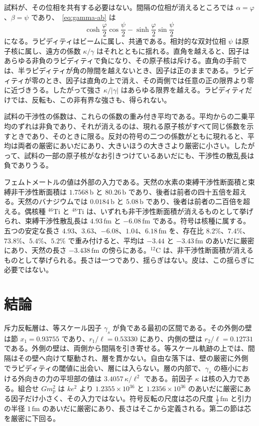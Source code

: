 \documentclass[a4paper]{article}
\begin{document}
試料が、その位相を共有する必要はない。間隔の位相が消えるところでは \(\alpha=\varphi\)、\(\beta=\psi\) であり、~\eqref{eq:gamma-ab} は
\[
\cosh\frac{\varphi}{2}\cos\frac{\psi}{2}-\sinh\frac{\varphi}{2}\sin\frac{\psi}{2}
\]
になる。ラピディティはビームに属し、共通である。相対的な双対位相 \(\psi\) は原子核に属し、遠方の係数 \(\kappa/\gamma\) はそれとともに揺れる。直角を越えると、因子はあらゆる非負のラピディティで負になり、その原子核は斥ける。直角の手前では、半ラピディティが角の隙間を越えないとき、因子は正のままである。ラピディティが零のとき、因子は直角の上で消え、その両側では任意の正の限界より零に近づきうる。したがって強さ \(\kappa/|\gamma|\) はあらゆる限界を越える。ラピディティだけでは、反転も、この非有界な強さも、得られない。

試料の干渉性の係数は、これらの係数の重み付き平均である。平均からの二乗平均のずれは非負であり、それが消えるのは、現れる原子核がすべて同じ係数を示すときであり、そのときに限る。反対の符号の二つの係数がともに現れると、平均は両者の厳密にあいだにあり、大きいほうの大きさより厳密に小さい。したがって、試料の一部の原子核がなお引きつけているあいだにも、干渉性の散乱長は負でありうる。

フェムトメートルの値は外部の入力である。天然の水素の束縛干渉性断面積と束縛非干渉性断面積は \(1.7568\,\mathrm{b}\) と \(80.26\,\mathrm{b}\) であり、後者は前者の四十五倍を超える。天然のバナジウムでは \(0.0184\,\mathrm{b}\) と \(5.08\,\mathrm{b}\) であり、後者は前者の二百倍を超える。偶核種 \({}^{46}\mathrm{Ti}\) と \({}^{48}\mathrm{Ti}\) は、いずれも非干渉性断面積が消えるものとして挙げられ、束縛干渉性散乱長は \(4.93\,\mathrm{fm}\) と \(-6.08\,\mathrm{fm}\) である。符号は核種に属する。五つの安定な長さ \(4.93\)、\(3.63\)、\(-6.08\)、\(1.04\)、\(6.18\,\mathrm{fm}\) を、存在比 \(8.2\%\)、\(7.4\%\)、\(73.8\%\)、\(5.4\%\)、\(5.2\%\) で重み付けると、平均は \(-3.44\) と \(-3.43\,\mathrm{fm}\) のあいだに厳密にあり、天然の長さ \(-3.438\,\mathrm{fm}\) の傍らにある。\({}^{12}\mathrm{C}\) は、非干渉性断面積が消えるものとして挙げられる。長さは一つであり、揺らぎはない。皮は、この揺らぎに必要ではない。

\section{結論}
\label{sec:conclusions}

斥力反転層は、等スケール因子 \(\gamma_s\) が負である最初の区間である。その外側の壁は節 \(x_1=0.93755\) であり、\(r_1/\ell=0.53330\) にあり、内側の壁は \(r_2/\ell=0.12731\) である。外側の壁は、両側から間隔を引き寄せる。等スケール軌跡の上では、間隔はその壁へ向けて駆動され、層を貫かない。自由な落下は、壁の厳密に外側でラピディティの閾値に出会い、層には入らない。層の内部で、\(\gamma_s\) の極小における外向きの力の平坦部の値は \(3.4057\,\kappa/\ell^{2}\) である。前因子 \(\kappa\) は核の入力である。組合せ \(G m_p^2\) は \(ke^{2}\) より \(1.2355\times 10^{36}\) と \(1.2356\times 10^{36}\) のあいだに厳密にある因子だけ小さく、その入力ではない。符号反転の尺度は芯の尺度 \(\tfrac12\,\mathrm{fm}\) と引力の半径 \(1\,\mathrm{fm}\) のあいだに厳密にあり、長さはそこから定義される。第二の節は芯を厳密に下回る。
\end{document}
